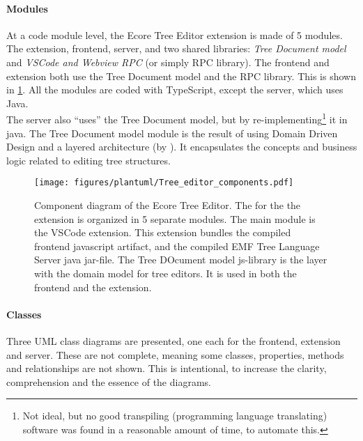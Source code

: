 \paragraph{Modules}
At a code module level, the Ecore Tree Editor extension is made of 5 modules.
The extension, frontend, server, and two shared libraries: \textit{Tree Document model} and \textit{VSCode and Webview RPC} (or simply RPC library).
The frontend and extension both use the Tree Document model and the RPC library.
This is shown in \cref{fig:extension-code-modules}.
All the modules are coded with \gls{TypeScript}, except the server, which uses Java.\\

The server also ``uses'' the Tree Document model, but by re-implementing\footnote{Not ideal, but no good transpiling (programming language translating) software was found in a reasonable amount of time, to automate this.} it in java.
The Tree Document model module is the result of using Domain Driven Design and a layered architecture (by \textcite{evansDomaindrivenDesignTackling2004}).
It encapsulates the concepts and business logic related to editing tree structures.


\begin{figure}[htbp]  %
  \centering
  \texttt{[image: figures/plantuml/Tree\_editor\_components.pdf]}
  \caption[Ecore Tree Editor component diagram]{Component diagram of the Ecore Tree Editor.
  The for the the extension is organized in 5 separate modules.
  The main module is the VSCode extension.
  This extension bundles the compiled frontend javascript artifact, and the compiled EMF Tree Language Server java jar-file.
  The Tree DOcument model js-library is the layer with the domain model for tree editors.
  It is used in both the frontend and the extension.
  }\label{fig:extension-code-modules}
\end{figure}

\paragraph{Classes}
Three \gls{UML} class diagrams are presented, one each for the frontend, extension and server.
These are not complete, meaning some classes, properties, methods and relationships are not shown.
This is intentional, to increase the clarity, comprehension and the essence of the diagrams.

